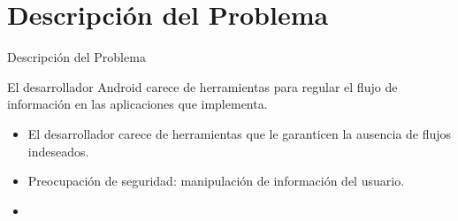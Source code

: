  \section{Descripción del Problema}
	
\begin{frame}{Descripción del Problema}
	\begin{block}{}
	El desarrollador Android carece de herramientas para regular el flujo de
	información en las aplicaciones que implementa.
	\end{block}
	
	\begin{itemize}
	  \item El desarrollador carece de herramientas que le garanticen la ausencia
	  de flujos indeseados.
	  \item Preocupación de seguridad: manipulación de información del usuario.
	  \item 
	\end{itemize}
	
\end{frame}